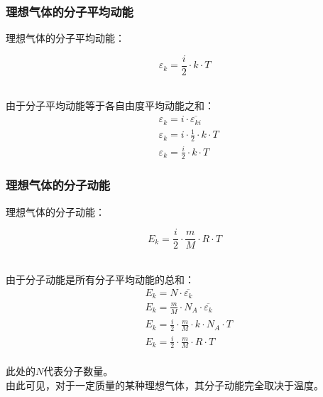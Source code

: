 \documentclass[UTF8]{ctexart}
\begin{document}
\newpage

\subsubsection{理想气体的分子平均动能}
    \setcounter{equation}{0}
    理想气体的分子平均动能：
    \begin{large}
        \begin{equation*}
            \varepsilon_k=\frac{i}{2}\cdot k\cdot T
        \end{equation*}
    \end{large}\\
    由于分子平均动能等于各自由度平均动能之和：
    \begin{align}
        &\varepsilon_k=i\cdot\overline{\varepsilon_{ki}}\\[3mm]
        &\varepsilon_k=i\cdot\frac{1}{2}\cdot k\cdot T\\[3mm]
        &\varepsilon_k=\frac{i}{2}\cdot k\cdot T
    \end{align}\vspace{5pt}

\subsubsection{理想气体的分子动能}
    \setcounter{equation}{0}
    理想气体的分子动能：
    \begin{large}
        \begin{equation*}
            E_k=\frac{i}{2}\cdot\frac{m}{M}\cdot R\cdot T
        \end{equation*}
    \end{large}\\
    由于分子动能是所有分子平均动能的总和：\vspace{5pt}
    \begin{align}
        &E_k=N\cdot\overline{\varepsilon_k}\\[3mm]
        &E_k=\frac{m}{M}\cdot N_A\cdot\overline{\varepsilon_k}\\[3mm]
        &E_k=\frac{i}{2}\cdot\frac{m}{M}\cdot k\cdot N_A\cdot T\\[3mm]
        &E_k=\frac{i}{2}\cdot\frac{m}{M}\cdot R\cdot T
    \end{align}\\
    此处的$N$代表分子数量。\\[3mm]
    由此可见，对于一定质量的某种理想气体，其分子动能完全取决于温度。

\newpage
\end{document}
